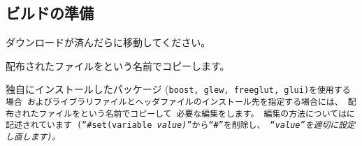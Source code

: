 \subsection{ビルドの準備}
\label{subsec:Preparation}

\noindent
ダウンロードが済んだらに移動してください。

\noindent
配布されたファイルを\CMakeLists{}という名前でコピーします。


\bigskip
\noindent
独自にインストールしたパッケージ
(\tt{boost}, \tt{glew}, \tt{freeglut}, \tt{glui})を使用する場合
およびライブラリファイルとヘッダファイルのインストール先を指定する場合には、
配布されたファイルを\CMakeConf{}という名前でコピーして
必要な編集をします。
編集の方法については\CMakeConf{}に記述されています
(``\tt{\#set(variable \it{value})}''から``\tt{\#}''を削除し、
``\it{value}''を適切に設定し直します)。

